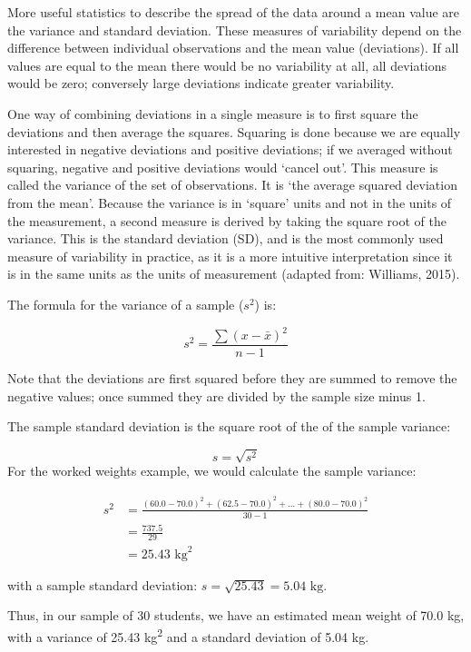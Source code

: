 \documentclass[
]{memoir}
\begin{document}
More useful statistics to describe the spread of the data around a mean value are the variance and standard deviation. These measures of variability depend on the difference between individual observations and the mean value (deviations). If all values are equal to the mean there would be no variability at all, all deviations would be zero; conversely large deviations indicate greater variability.

One way of combining deviations in a single measure is to first square the deviations and then average the squares. Squaring is done because we are equally interested in negative deviations and positive deviations; if we averaged without squaring, negative and positive deviations would `cancel out'. This measure is called the variance of the set of observations. It is `the average squared deviation from the mean'. Because the variance is in `square' units and not in the units of the measurement, a second measure is derived by taking the square root of the variance. This is the standard deviation (SD), and is the most commonly used measure of variability in practice, as it is a more intuitive interpretation since it is in the same units as the units of measurement (adapted from: Williams, 2015).

The formula for the variance of a sample (\(s^2\)) is:

\[ s^2 = \frac{\sum(x - \bar{x})^2}{n-1} \]

Note that the deviations are first squared before they are summed to remove the negative values; once summed they are divided by the sample size minus 1.

The sample standard deviation is the square root of the of the sample variance:

\[s = \sqrt{s^2}\]
For the worked weights example, we would calculate the sample variance:

\[\begin{aligned}
  s^2 &= \frac{(60.0 - 70.0)^2 + (62.5 - 70.0)^2 + \dots + (80.0 - 70.0)^2}{30-1} \\
      &= \frac{737.5}{29} \\
      &= 25.43 \text{ kg}^2
  \end{aligned}\]

with a sample standard deviation: \(s = \sqrt{25.43} = 5.04 \text{ kg}\).

Thus, in our sample of 30 students, we have an estimated mean weight of 70.0 kg, with a variance of 25.43 kg\textsuperscript{2} and a standard deviation of 5.04 kg.
\end{document}
